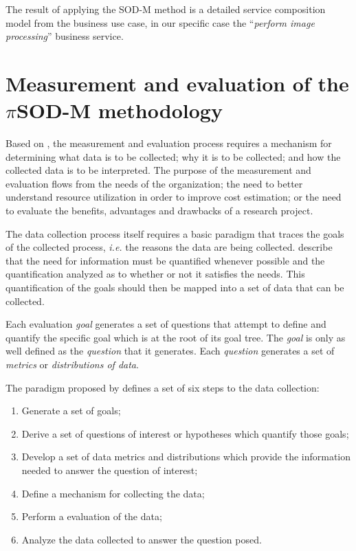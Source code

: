 The result of applying the SOD-M method is a detailed service composition model
from the business use case, in our specific case the ``\textit{perform image
processing}'' business service. 
 
 



\section{Measurement and evaluation of the $\pi$SOD-M methodology}

Based on \cite{basili:1985}, the measurement and evaluation process requires a
mechanism for determining what data is to be collected; why it is to be
collected; and how the collected data is to be interpreted. The purpose of the measurement and
evaluation flows from the needs of the organization; the need to better
understand resource utilization in order to improve cost estimation; or the need
to evaluate the benefits, advantages and drawbacks of a research project.

The data collection process itself requires a basic paradigm that traces the
goals of the collected process, \textit{i.e.} the reasons the data are being
collected. \cite{basili:1985,Kontio:1996} describe that the need for information
must be quantified whenever possible and the quantification analyzed as to whether or not it
satisfies the needs. This quantification of the goals should then be mapped into
a set of data that can be collected.

Each evaluation \textit{goal} generates a set of questions that attempt to
define and quantify the specific goal which is at the root of its goal tree. The
\textit{goal} is only as well defined as the \textit{question} that it
generates. Each \textit{question} generates a set of \textit{metrics} or
\textit{distributions of data}.

The paradigm proposed by \cite{basili:1985} defines a set of six steps to the
data collection:

\begin{enumerate}
  \item Generate a set of goals;
  \item Derive a set of questions of interest or hypotheses which quantify those
  goals;
  \item Develop a set of data metrics and distributions which provide the
  information needed to answer the question of interest;
  \item Define a mechanism for collecting the data;
  \item Perform a evaluation of the data; 
  \item Analyze the data collected to answer the question posed.
\end{enumerate} 

